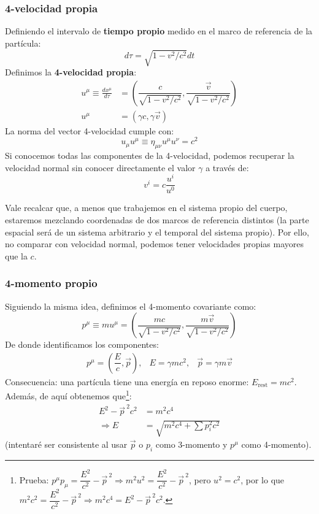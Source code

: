 \documentclass[]{article}
\numberwithin{equation}{section}
\begin{document}
\subsubsection{4-velocidad propia}
Definiendo el intervalo de \textbf{tiempo propio} medido en el marco de referencia de la partícula:
\begin{equation}
	d\tau = \sqrt{1-v^2/c^2}dt
\end{equation}
Definimos la \textbf{4-velocidad propia}:
\begin{align}
	u^\mu \equiv \frac{dx^\mu}{d\tau} &= \left(\dfrac{c}{\sqrt{1 - v^2/c^2}}, \dfrac{\vec{v}}{\sqrt{1 - v^2/c^2}} \right) \\
	u^\mu &= \left(\gamma c, \gamma\vec{v} \right)
\end{align}
La norma del vector 4-velocidad cumple con:
\begin{equation}
	u_\mu u^\mu \equiv \eta_{\mu\nu}u^\mu u^\nu = c^2 \label{uu_c2}
\end{equation}
Si conocemos todas las componentes de la 4-velocidad, podemos recuperar la velocidad normal sin conocer directamente el valor \(\gamma\) a través de:
\begin{equation}
	v^i = c\frac{u^i}{u^0}
\end{equation}

Vale recalcar que, a menos que trabajemos en el sistema propio del cuerpo, estaremos mezclando coordenadas de dos marcos de referencia distintos (la parte espacial será de un sistema arbitrario y el temporal del sistema propio). Por ello, no comparar con velocidad normal, podemos tener velocidades propias mayores que la \(c\).

\subsubsection{4-momento propio}
Siguiendo la misma idea, definimos el 4-momento covariante como:
\begin{equation}
	p^\mu \equiv mu^\mu = \left(\dfrac{mc}{\sqrt{1 - v^2/c^2}}, \dfrac{m\vec{v}}{\sqrt{1 - v^2/c^2}} \right) 
\end{equation}
De donde identificamos los componentes:
\begin{equation}
	\begin{matrix}
		p^\mu  = \left(\dfrac{E}{c}, \vec{p}\right), & E = \gamma mc^2, & \vec{p} = \gamma m\vec{v}
	\end{matrix}
\end{equation}
Consecuencia: una partícula tiene una energía en reposo enorme: \(E_{\text{rest}}=mc^2\). Además, de aquí obtenemos que\footnote{Prueba: \(p^\mu p_\mu = \dfrac{E^2}{c^2} - \vec{p}^{\ 2} \Rightarrow m^2u^2 = \dfrac{E^2}{c^2} - \vec{p}^{\ 2}\), pero \(u^2 = c^2\), por lo que \(m^2c^2 = \dfrac{E^2}{c^2} - \vec{p}^{\ 2} \Rightarrow m^2c^4 = E^2 - \vec{p}^{\ 2}c^2 \).}:
\begin{align}
	E^2 - \vec{p}^{\ 2}c^2 &= m^2c^4 \label{eqn:relacion_energia_momento}\\
	\Rightarrow E &= \sqrt{m^2c^4 + \sum p_i^2c^2}
\end{align}
(intentaré ser consistente al usar \(\vec{p}\) o \(p_i\) como 3-momento y \(p^\mu\) como 4-momento).
\end{document}
